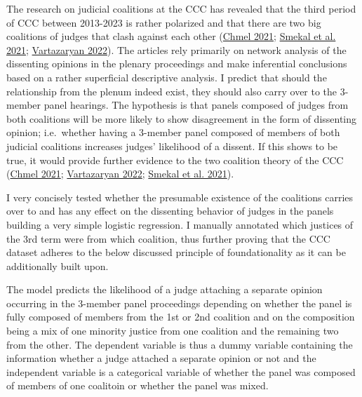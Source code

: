 \documentclass[
  11pt,
]{article}
\begin{document}
The research on judicial coalitions at the CCC has revealed that the
third period of CCC between 2013-2023 is rather polarized and that there
are two big coalitions of judges that clash against each other
(\protect\hyperlink{ref-chmelCoOvlivnujeUstavni2021}{Chmel 2021};
\protect\hyperlink{ref-smekalMimopravniVlivyNa2021}{Smekal et al. 2021};
\protect\hyperlink{ref-vartazaryanSitOvaAnalyza2022}{Vartazaryan 2022}).
The articles rely primarily on network analysis of the dissenting
opinions in the plenary proceedings and make inferential conclusions
based on a rather superficial descriptive analysis. I predict that
should the relationship from the plenum indeed exist, they should also
carry over to the 3-member panel hearings. The hypothesis is that panels
composed of judges from both coalitions will be more likely to show
disagreement in the form of dissenting opinion; i.e.~whether having a
3-member panel composed of members of both judicial coalitions increases
judges' likelihood of a dissent. If this shows to be true, it would
provide further evidence to the two coalition theory of the CCC
(\protect\hyperlink{ref-chmelCoOvlivnujeUstavni2021}{Chmel 2021};
\protect\hyperlink{ref-vartazaryanSitOvaAnalyza2022}{Vartazaryan 2022};
\protect\hyperlink{ref-smekalMimopravniVlivyNa2021}{Smekal et al.
2021}).

I very concisely tested whether the presumable existence of the
coalitions carries over to and has any effect on the dissenting behavior
of judges in the panels building a very simple logistic regression. I
manually annotated which justices of the 3rd term were from which
coalition, thus further proving that the CCC dataset adheres to the
below discussed principle of foundationality as it can be additionally
built upon.

The model predicts the likelihood of a judge attaching a separate
opinion occurring in the 3-member panel proceedings depending on whether
the panel is fully composed of members from the 1st or 2nd coalition and
on the composition being a mix of one minority justice from one
coalition and the remaining two from the other. The dependent variable
is thus a dummy variable containing the information whether a judge
attached a separate opinion or not and the independent variable is a
categorical variable of whether the panel was composed of members of one
coalitoin or whether the panel was mixed.
\end{document}
